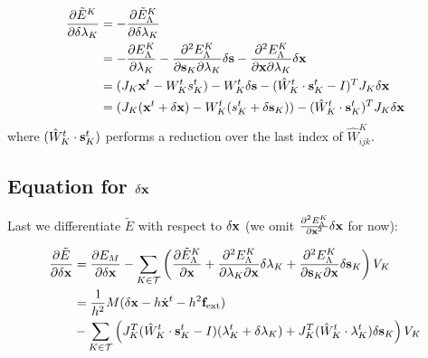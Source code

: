\begin{equation}
\begin{split}
\frac{\partial \tilde{E}^K}{\partial \delta \mathbf{\lambda}_K} &= - \frac{\partial \tilde{E}^K_\Lambda}{\partial \delta \mathbf{\lambda}_K} \\
&= -\frac{\partial E_\Lambda^K}{\partial \mathbf{\lambda}_K} - \frac{\partial^2 E_\Lambda^K}{\partial \mathbf{s}_K \partial \mathbf{\lambda}_K}\delta \mathbf{s} - \frac{\partial^2 E_\Lambda^K}{\partial \mathbf{x} \partial \mathbf{\lambda}_K}\delta \mathbf{x} \\
&= (J_K\mathbf{x}^t - W_K^ts_K^t) - W_K^t \delta \mathbf{s} - (\hat{W}_K^{t}\cdot \mathbf{s}_K^t - I)^T J_K \delta \mathbf{x} \\
&= (J_K(\mathbf{x}^t + \delta \mathbf{x}) - W_K^t (s_K^t + \delta \mathbf{s}_K)) - (\hat{W}_K^{t}\cdot \mathbf{s}_K^t)^T J_K \delta \mathbf{x} \\
\end{split}
\end{equation}
where $(\hat{W}_K^{t}\cdot \mathbf{s}_K^t)$ performs a reduction over the last index of $\hat{W}^K_{ijk}$.

\subsection{Equation for $\delta \mathbf{x}$}
Last we differentiate $\tilde{E}$ with respect to $\delta \mathbf{x}$ (we omit $\frac{\partial^2 E_\Lambda^K}{ \partial \mathbf{x}^2} \delta \mathbf{x}$ for now):

\begin{equation}
\begin{split}
\frac{\partial \tilde{E}}{\partial \delta \mathbf{x}} &= \frac{\partial E_M }{\partial \delta \mathbf{x}} - \sum_{K \in \mathcal{T}} \left(
  \frac{\partial \tilde{E}^K_\Lambda}{\partial \mathbf{x}} 
+ \frac{\partial^2 E_\Lambda^K}{\partial \mathbf{\lambda}_K \partial \mathbf{x}} \delta \mathbf{\lambda}_K
+ \frac{\partial^2 E_\Lambda^K}{\partial \mathbf{s}_K  \partial \mathbf{x}} \delta \mathbf{s}_K
\right) V_K \\
&=  \frac{1}{h^2}M(\delta \mathbf{x} - h\dot{\mathbf{x}}^t - h^2 \mathbf{f}_\text{ext}) \\
&- \sum_{K \in \mathcal{T}} \left(
J_K^T(\hat{W}_K^{t}\cdot \mathbf{s}_K^t - I)(\mathbf{\lambda}_K^t + \delta \mathbf{\lambda}_K) +
J_K^T(\hat{W}_K^{t}\cdot \mathbf{\lambda}_K^t) \delta \mathbf{s}_K
\right)V_K
\end{split}
\end{equation}

